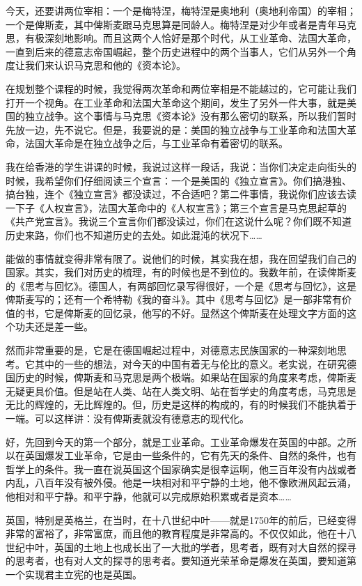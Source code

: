 \documentclass[UTF8, 12pt, a4paper]{ctexrep}
\begin{document}
今天，还要讲两位宰相：一个是梅特涅，梅特涅是奥地利（奥地利帝国）的宰相；一个是俾斯麦，其中俾斯麦跟马克思算是同龄人。梅特涅是对少年或者是青年马克思，有极深刻地影响。而且这两个人恰好是那个时代，从工业革命、法国大革命，一直到后来的德意志帝国崛起，整个历史进程中的两个当事人，它们从另外一个角度让我们来认识马克思和他的《资本论》。

在规划整个课程的时候，我觉得两次革命和两位宰相是不能越过的，它可能让我们打开一个视角。在工业革命和法国大革命这个期间，发生了另外一件大事，就是美国的独立战争。这个事情与马克思《资本论》没有那么密切的联系，所以我们暂时先放一边，先不说它。但是，我要说的是：美国的独立战争与工业革命和法国大革命，法国大革命是在独立战争之后，与工业革命有着密切的联系。

我在给香港的学生讲课的时候，我说过这样一段话，我说：当你们决定走向街头的时候，我希望你们仔细阅读三个宣言：一个是美国的《独立宣言》。你们搞港独、搞台独，连个《独立宣言》都没读过，不合适吧？第二件事情，我说你们应该去读一下子《人权宣言》，法国大革命中的《人权宣言》；第三个宣言是马克思起草的《共产党宣言》。我说三个宣言你们都没读过，你们在这说什么呢？你们既不知道历史来路，你们也不知道历史的去处。如此混沌的状况下……

能做的事情就变得非常有限了。说他们的时候，其实我在想，我在回望我们自己的国家。其实，我们对历史的梳理，有的时候也是不到位的。我数年前，在读俾斯麦的《思考与回忆》。德国人，有两部回忆录写得很好，一个是《思考与回忆》，这是俾斯麦写的；还有一个希特勒《我的奋斗》。其中《思考与回忆》是一部非常有价值的书，它是俾斯麦的回忆录，他写的不好。显然这个俾斯麦在处理文字方面的这个功夫还是差一些。

然而非常重要的是，它是在德国崛起过程中，对德意志民族国家的一种深刻地思考。它其中的一些的想法，对今天的中国有着无与伦比的意义。老实说，在研究德国历史的时候，俾斯麦和马克思是两个极端。如果站在国家的角度来考虑，俾斯麦无疑更具价值。但是站在人类、站在人类文明、站在哲学史的角度考虑，马克思是无比的辉煌的，无比辉煌的。但，历史是这样的构成的，有的时候我们不能执着于一端。可以这样讲：没有俾斯麦就没有德意志的现代化。

好，先回到今天的第一个部分，就是工业革命。工业革命爆发在英国的中部。之所以在英国爆发工业革命，它是由一些条件的，它有先天的条件、自然的条件，也有哲学上的条件。我一直在说英国这个国家确实是很幸运啊，他三百年没有内战或者内乱，八百年没有被外侵。他是一块相对和平宁静的土地，他不像欧洲风起云涌，他相对和平宁静。和平宁静，他就可以完成原始积累或者是资本……

英国，特别是英格兰，在当时，在十八世纪中叶——就是1750年的前后，已经变得非常的富裕了，非常富庶，而且他的教育程度是非常高的。不仅仅如此，他在十八世纪中叶，英国的土地上也成长出了一大批的学者，思考者，既有对大自然的探寻的思考者，也有对人文的探寻的思考者。要知道光荣革命是爆发在英国，要知道第一个实现君主立宪的也是英国。
\end{document}
